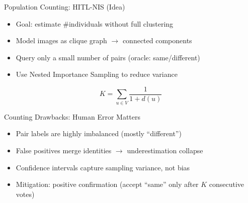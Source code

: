 \documentclass[aspectratio=169]{beamer}
\begin{document}
\begin{frame}{Population Counting: HITL-NIS (Idea)}
  \Large
  \begin{itemize}
    \item Goal: estimate \#individuals without full clustering
    \item Model images as clique graph $\rightarrow$ connected components
    \item Query only a small number of pairs (oracle: same/different)
    \item Use Nested Importance Sampling to reduce variance
  \end{itemize}

  \vspace{0.25cm}
  \Large
  \[
    K = \sum_{u \in V}\frac{1}{1 + d(u)}
  \]
\end{frame}

\begin{frame}{Counting Drawbacks: Human Error Matters}
  \Large
  \begin{itemize}
    \item Pair labels are highly imbalanced (mostly ``different'')
    \item False positives merge identities $\rightarrow$ underestimation collapse
    \item Confidence intervals capture sampling variance, not bias
    \item Mitigation: positive confirmation (accept ``same'' only after \(K\) consecutive votes)
  \end{itemize}
\end{frame}
\end{document}
